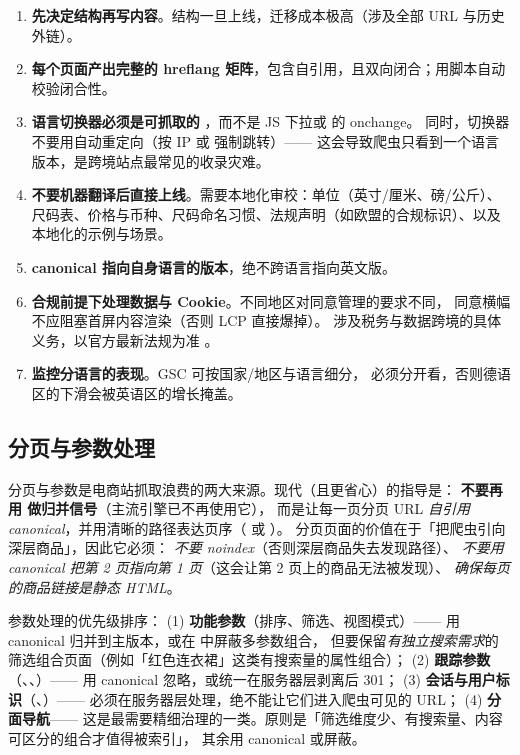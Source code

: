 \begin{toolbox}
\begin{enumerate}
  \item \textbf{先决定结构再写内容}。结构一旦上线，迁移成本极高（涉及全部 URL 与历史外链）。
  \item \textbf{每个页面产出完整的 hreflang 矩阵}，包含自引用，且双向闭合；用脚本自动校验闭合性。
  \item \textbf{语言切换器必须是可抓取的 }，而不是 JS 下拉或  的 onchange。
        同时，切换器不要用自动重定向（按 IP 或  强制跳转）——
        这会导致爬虫只看到一个语言版本，是跨境站点最常见的收录灾难。
  \item \textbf{不要机器翻译后直接上线}。需要本地化审校：单位（英寸/厘米、磅/公斤）、
        尺码表、价格与币种、尺码命名习惯、法规声明（如欧盟的合规标识）、以及本地化的示例与场景。
  \item \textbf{canonical 指向自身语言的版本}，绝不跨语言指向英文版。
  \item \textbf{合规前提下处理数据与 Cookie}。不同地区对同意管理的要求不同，
        同意横幅不应阻塞首屏内容渲染（否则 LCP 直接爆掉）。
        涉及税务与数据跨境的具体义务，以官方最新法规为准 \cite{eu_oss}。
  \item \textbf{监控分语言的表现}。GSC 可按国家/地区与语言细分，
        必须分开看，否则德语区的下滑会被英语区的增长掩盖。
\end{enumerate}
\end{toolbox}

\subsection{分页与参数处理}

分页与参数是电商站抓取浪费的两大来源。现代（且更省心）的指导是：
\textbf{不要再用  做归并信号}（主流引擎已不再使用它），
而是让每一页分页 URL \emph{自引用 canonical}，并用清晰的路径表达页序（ 或 ）。
分页页面的价值在于「把爬虫引向深层商品」，因此它必须：
\emph{不要 noindex}（否则深层商品失去发现路径）、
\emph{不要用 canonical 把第 2 页指向第 1 页}（这会让第 2 页上的商品无法被发现）、
\emph{确保每页的商品链接是静态 HTML}。

参数处理的优先级排序：
(1) \textbf{功能参数}（排序、筛选、视图模式）——
用 canonical 归并到主版本，或在  中屏蔽多参数组合，
但要保留\emph{有独立搜索需求}的筛选组合页面（例如「红色连衣裙」这类有搜索量的属性组合）；
(2) \textbf{跟踪参数}（、、）——
用 canonical 忽略，或统一在服务器层剥离后 301；
(3) \textbf{会话与用户标识}（、）——
必须在服务器层处理，绝不能让它们进入爬虫可见的 URL；
(4) \textbf{分面导航}——
这是最需要精细治理的一类。原则是「筛选维度少、有搜索量、内容可区分的组合才值得被索引」，
其余用 canonical 或屏蔽。

